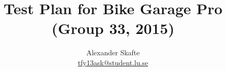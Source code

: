 \title{
	Test Plan for Bike Garage Pro (Group 33, 2015)\\
}
\author{
	Alexander Skafte\\
	\url{tfy13ask@student.lu.se}\\
}
\date{}
